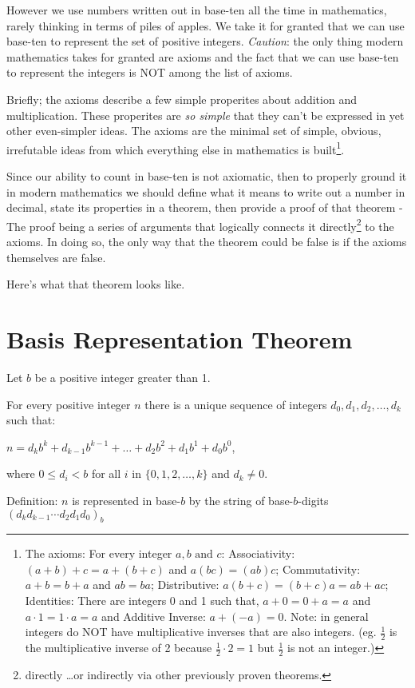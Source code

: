 \documentclass{article}
\newenvironment{jprIn}{\begin{adjustwidth}{2em}{}}{\end{adjustwidth}}
\begin{document}
However we use numbers written out in base-ten all the time in mathematics,
rarely thinking in terms of piles of apples.
We take it for granted
that we can use base-ten to represent the set of positive integers.
\emph{Caution}: the only thing modern mathematics takes for granted are axioms
and the fact that we can use base-ten to represent the integers is NOT among the list of axioms.

Briefly; the axioms describe a few simple properites about addition and multiplication.
These properites are \emph{so simple} that they can't be expressed in
yet other even-simpler ideas. The axioms are the minimal set of simple,
obvious, irrefutable ideas from which
everything else in mathematics is built\footnote{The axioms:
For every integer $a,b\text{ and }c$:
Associativity: $(a+b)+c=a+(b+c)$ and $a(bc)=(ab)c$;
Commutativity: $a+b=b+a$ and $ab=ba$;
Distributive: $a(b+c)=(b+c)a=ab+ac$;
Identities: There are integers 0 and 1 such that,
$a+0=0+a=a$ and $a\cdot{}1=1\cdot{}a=a$ and
Additive Inverse: $a+(-a)=0$.
Note: in general integers do NOT have multiplicative inverses 
that are also integers. (eg. $\frac{1}{2}$ is the multiplicative
inverse of 2 because $\frac{1}{2}\cdot{}2=1$ but $\frac{1}{2}$ is not an integer.)}.

Since our ability to count in base-ten is not axiomatic, then to properly ground
it in modern mathematics we should
define what it means to write out a number in decimal,
state its properties in a theorem,
then provide a proof of that theorem -
The proof being
a series of arguments that logically connects it
directly\footnote{directly \dots{}or indirectly
via other previously proven theorems.} to the axioms. 
In doing so, the only way
that the theorem could be false is if the axioms themselves are false.

Here's what that theorem looks like.

\section*{Basis Representation Theorem}
\begin{jprIn}
Let $b$ be a positive integer greater than 1.

For every positive integer $n$ there is a unique sequence
of integers $d_0, d_1, d_2,\dots{},d_k$ such that:

\hspace{3em}$n=d_kb^k+d_{k-1}b^{k-1}+\dots+d_2b^2+d_1b^1+d_0b^0$,

where $0\le{}d_i<b$ for all $i$ in $\{0,1,2,\dots{},k\}$ and $d_k\ne0$.

Definition: $n$ is represented in base-$b$ by the string
of base-$b$-digits $(d_kd_{k-1}{\cdots}d_2d_1d_0)_b$
\end{jprIn}
\bigskip
\end{document}
